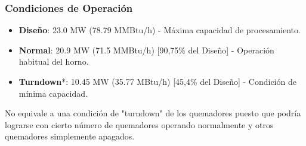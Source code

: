 \subsubsection{Condiciones de Operación}

\begin{itemize}
\item \textbf{Diseño}: 23.0 MW (78.79 MMBtu/h) - Máxima capacidad de procesamiento.
\item \textbf{Normal}: 20.9 MW (71.5 MMBtu/h) [90,75\% del Diseño] - Operación habitual del horno.
\item \textbf{Turndown}*: 10.45 MW (35.77 MBtu/h) [45,4\% del Diseño] - Condición de mínima capacidad.
\end{itemize}

\par *No equivale a una condición de "turndown" de los quemadores puesto que podría lograrse con cierto número de quemadores operando normalmente y otros quemadores simplemente apagados.